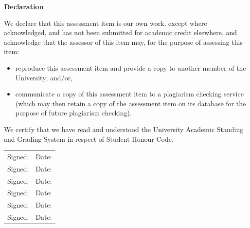 \documentclass[11pt,a4paper]{article}
\begin{document}

\clearpage
\thispagestyle{empty}

\vspace*{0.8cm}

{\large\bfseries Declaration}

\vspace{0.5cm}

We declare that this assessment item is our own work, except where acknowledged, and has not been submitted for academic credit elsewhere, and acknowledge that the assessor of this item may, for the purpose of assessing this item:

\begin{itemize}[leftmargin=2em]
    \item reproduce this assessment item and provide a copy to another member of the University; and/or,
    \item communicate a copy of this assessment item to a plagiarism checking service (which may then retain a copy of the assessment item on its database for the purpose of future plagiarism checking).
\end{itemize}

\vspace{0.6cm}

We certify that we have read and understood the University Academic Standing and Grading System in respect of Student Honour Code.

\vspace{1.2cm}

\begin{tabularx}{\textwidth}{X X}
Signed: \hrulefill & Date: \hrulefill \\[0.75cm]
Signed: \hrulefill & Date: \hrulefill \\[0.75cm]
Signed: \hrulefill & Date: \hrulefill \\[0.75cm]
Signed: \hrulefill & Date: \hrulefill \\[0.75cm]
Signed: \hrulefill & Date: \hrulefill \\[0.75cm]
Signed: \hrulefill & Date: \hrulefill \\
\end{tabularx}


\clearpage
\pagestyle{empty}
\end{document}
